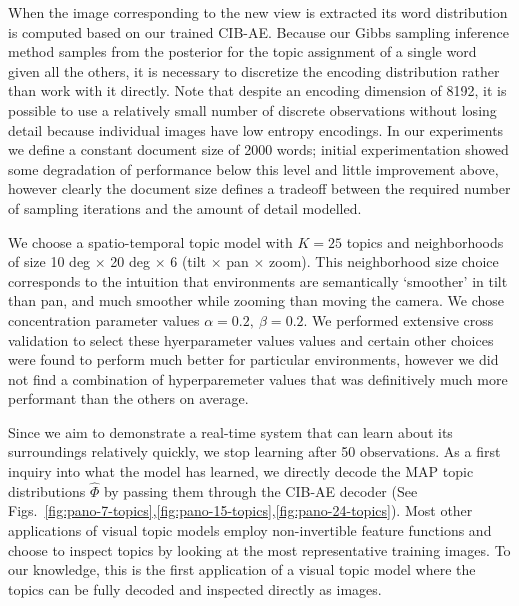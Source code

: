 When the image corresponding to the new view is extracted its word distribution is computed based on our trained CIB-AE. Because our Gibbs sampling inference method samples from the posterior for the topic assignment of a single word given all the others, it is necessary to discretize the encoding distribution rather than work with it directly. Note that despite an encoding dimension of 8192, it is possible to use a relatively small number of discrete observations without losing detail because individual images have low entropy encodings. In our experiments we define a constant document size of 2000 words; initial experimentation showed some degradation of performance below this level and little improvement above, however clearly the document size defines a tradeoff between the required number of sampling iterations and the amount of detail modelled.

We choose a spatio-temporal topic model with $K = 25$ topics and neighborhoods of size 10 deg $\times$ 20 deg $\times$ 6 (tilt $\times$ pan $\times$ zoom). This neighborhood size choice corresponds to the intuition that environments are semantically `smoother' in tilt than pan, and much smoother while zooming than moving the camera. We chose concentration parameter values $\alpha = 0.2,~\beta = 0.2$. We performed extensive cross validation to select these hyerparameter values values and certain other choices were found to perform much better for particular environments, however we did not find a combination of hyperparemeter values that was definitively much more performant than the others on average.

Since we aim to demonstrate a real-time system that can learn about its surroundings relatively quickly, we stop learning after 50 observations. As a first inquiry into what the model has learned, we directly decode the MAP topic distributions $\hat{\Phi}$ by passing them through the CIB-AE decoder (See Figs.~\ref{fig:pano-7-topics},\ref{fig:pano-15-topics},\ref{fig:pano-24-topics}). Most other applications of visual topic models employ non-invertible feature functions and choose to inspect topics by looking at the most representative training images. To our knowledge, this is the first application of a visual topic model where the topics can be fully decoded and inspected directly as images.

